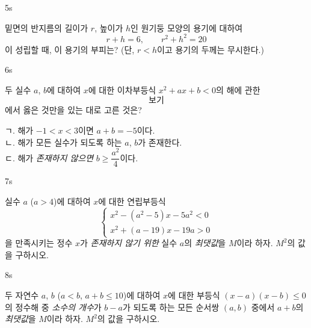 \documentclass[10pt]{article}
\begin{document}
\begin{pagepair}

\begin{problem}{5}{s}
\par\smallskip
밑면의 반지름의 길이가 $r$, 높이가 $h$인 원기둥 모양의 용기에 대하여
$$r + h = 6, \qquad r^2 + h^2 = 20$$
이 성립할 때, 이 용기의 부피는? (단, $r < h$이고 용기의 두께는 무시한다.)
\begin{center}
\end{center}
\begin{choices}
\choice{$12\pi$}
\choice{$16\pi$}
\choice{$20\pi$}
\choice{$24\pi$}
\choice{$32\pi$}
\end{choices}
\end{problem}

\begin{problem}{6}{s}
\par\smallskip
두 실수 $a$, $b$에 대하여 $x$에 대한 이차부등식 $x^2 + ax + b < 0$의 해에 관한 \[보기\]에서 옳은 것만을 있는 대로 고른 것은?
\begin{conditions}
\setlength{\baselineskip}{1.4\baselineskip}
ㄱ. 해가 $-1 < x < 3$이면 $a + b = -5$이다. \\[6pt]
ㄴ. 해가 모든 실수가 되도록 하는 $a$, $b$가 존재한다. \\[6pt]
ㄷ. 해가 \emph{존재하지 않으면} $b \ge \dfrac{a^2}{4}$이다.
\end{conditions}
\begin{choices}
\end{choices}
\end{problem}

\end{pagepair}


\begin{pagepair}

\begin{problem}{7}{s}
\par\smallskip
실수 $a$ ($a > 4$)에 대하여 $x$에 대한 연립부등식
$$\begin{cases} x^2 - (a^2 - 5)x - 5a^2 < 0 \\ x^2 + (a - 19)x - 19a > 0 \end{cases}$$
을 만족시키는 정수 $x$가 \emph{존재하지 않기 위한} 실수 $a$의 \emph{최댓값}을 $M$이라 하자. $M^2$의 값을 구하시오.
\end{problem}

\begin{problem}{8}{s}
\par\smallskip
두 자연수 $a$, $b$ ($a < b$, $a + b \le 10$)에 대하여 $x$에 대한 부등식 $(x - a)(x - b) \le 0$의 정수해 중 \emph{소수의 개수}가 $b - a$가 되도록 하는 모든 순서쌍 $(a, b)$ 중에서 $a + b$의 \emph{최댓값}을 $M$이라 하자. $M^2$의 값을 구하시오.
\end{problem}

\end{pagepair}
\end{document}
